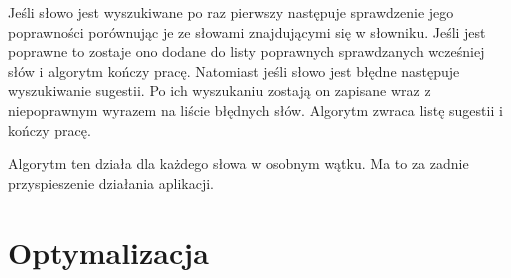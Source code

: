 Jeśli słowo jest wyszukiwane po raz pierwszy następuje sprawdzenie jego poprawności porównując je ze słowami znajdującymi się w słowniku. Jeśli jest poprawne to zostaje ono dodane do listy poprawnych sprawdzanych wcześniej słów i algorytm kończy pracę. Natomiast jeśli słowo jest błędne następuje wyszukiwanie sugestii. Po ich wyszukaniu zostają on zapisane wraz z niepoprawnym wyrazem na liście błędnych słów. Algorytm zwraca listę sugestii i kończy pracę.

Algorytm ten działa dla każdego słowa w osobnym wątku. Ma to za zadnie przyspieszenie działania aplikacji.  

\section{Optymalizacja}

